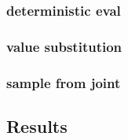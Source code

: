\documentclass{article}
\begin{document}
\subsubsection{deterministic eval}

\subsubsection{value substitution}

\subsubsection{sample from joint}


\subsection{Results}
\end{document}
